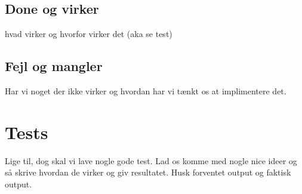 \documentclass[11pt,twoside,a4paper]{article}
\begin{document}
\subsection{Done og virker}
hvad virker og hvorfor virker det (aka se test)

\subsection{Fejl og mangler}
Har vi noget der ikke virker og hvordan har vi tænkt os at implimentere det.

\newpage
\pagestyle{fancy}
\section{Tests}
Lige til, dog skal vi lave nogle gode test. Lad os komme med nogle nice ideer og så skrive hvordan de virker og giv resultatet. Husk forventet output og faktisk output.
\end{document}
